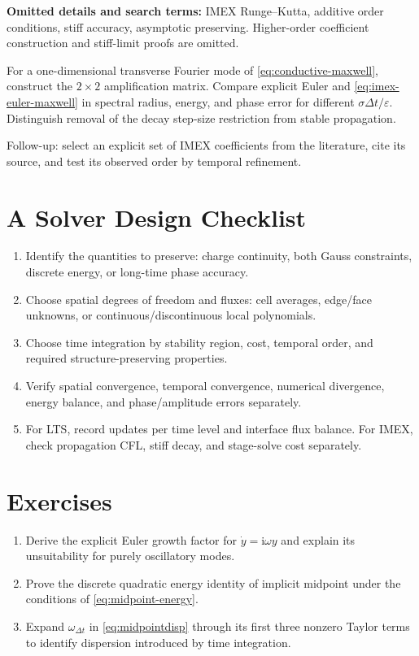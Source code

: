 \documentclass[11pt,openany]{book}
\numberwithin{equation}{chapter}
\theoremstyle{definition}
\theoremstyle{remark}
\begin{document}
\begin{askai}
\textbf{Omitted details and search terms:} IMEX Runge--Kutta, additive order conditions, stiff accuracy, asymptotic preserving.
Higher-order coefficient construction and stiff-limit proofs are omitted.

For a one-dimensional transverse Fourier mode of \eqref{eq:conductive-maxwell}, construct the $2\times2$ amplification matrix.
Compare explicit Euler and \eqref{eq:imex-euler-maxwell} in spectral radius, energy, and phase error for different $\sigma\Delta t/\varepsilon$.
Distinguish removal of the decay step-size restriction from stable propagation.

Follow-up: select an explicit set of IMEX coefficients from the literature, cite its source, and test its observed order by temporal refinement.
\end{askai}

\section{A Solver Design Checklist}
\begin{enumerate}
\item Identify the quantities to preserve: charge continuity, both Gauss constraints, discrete energy, or long-time phase accuracy.
\item Choose spatial degrees of freedom and fluxes: cell averages, edge/face unknowns, or continuous/discontinuous local polynomials.
\item Choose time integration by stability region, cost, temporal order, and required structure-preserving properties.
\item Verify spatial convergence, temporal convergence, numerical divergence, energy balance, and phase/amplitude errors separately.
\item For LTS, record updates per time level and interface flux balance. For IMEX, check propagation CFL, stiff decay, and stage-solve cost separately.
\end{enumerate}
\section{Exercises}
\begin{enumerate}
\item Derive the explicit Euler growth factor for $\dot y=\mathrm i\omega y$ and explain its unsuitability for purely oscillatory modes.
\item Prove the discrete quadratic energy identity of implicit midpoint under the conditions of \eqref{eq:midpoint-energy}.
\item Expand $\omega_{\Delta t}$ in \eqref{eq:midpointdisp} through its first three nonzero Taylor terms to identify dispersion introduced by time integration.
\end{enumerate}
\endgroup
\end{document}
